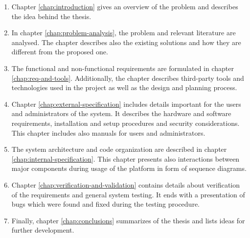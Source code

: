 \begin{enumerate}
	\item Chapter \ref{chap:introduction} gives an overview of the problem and describes the idea behind the thesis.
	\item In chapter \ref{chap:problem-analysis}, the problem and relevant literature are analysed. The chapter describes also the existing solutions and how they are different from the proposed one.
	\item The functional and non-functional requirements are formulated in chapter \ref{chap:req-and-tools}. Additionally, the chapter describes third-party tools and technologies used in the project as well as the design and planning process.
	\item Chapter \ref{chap:external-specification} includes details important for the users and administrators of the system. It describes the hardware and software requirements, installation and setup procedures and security considerations. This chapter includes also manuals for users and administrators.
	\item The system architecture and code organization are described in chapter \ref{chap:internal-specification}. This chapter presents also interactions between major components during usage of the platform in form of sequence diagrams.
	\item Chapter \ref{chap:verification-and-validation} contains details about verification of the requirements and general system testing. It ends with a presentation of bugs which were found and fixed during the testing procedure.
	\item Finally, chapter \ref{chap:conclusions} summarizes of the thesis and lists ideas for further development.
\end{enumerate}
